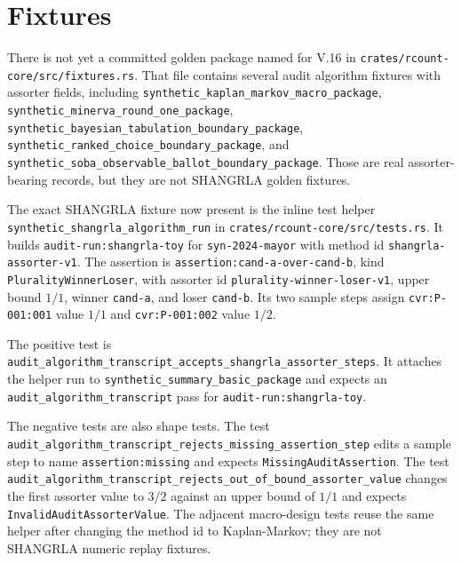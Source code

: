 \section{Fixtures}

There is not yet a committed golden package named for V.16 in
\texttt{crates/rcount-core/src/fixtures.rs}. That file contains several audit
algorithm fixtures with assorter fields, including
\texttt{synthetic\_kaplan\_markov\_macro\_package},
\texttt{synthetic\_minerva\_round\_one\_package},
\texttt{synthetic\_bayesian\_tabulation\_boundary\_package},
\texttt{synthetic\_ranked\_choice\_boundary\_package}, and
\texttt{synthetic\_soba\_observable\_ballot\_boundary\_package}. Those are real
assorter-bearing records, but they are not SHANGRLA golden fixtures.

The exact SHANGRLA fixture now present is the inline test helper
\texttt{synthetic\_shangrla\_algorithm\_run} in
\texttt{crates/rcount-core/src/tests.rs}. It builds
\texttt{audit-run:shangrla-toy} for \texttt{syn-2024-mayor} with method id
\texttt{shangrla-assorter-v1}. The assertion is
\texttt{assertion:cand-a-over-cand-b}, kind \texttt{PluralityWinnerLoser}, with
assorter id \texttt{plurality-winner-loser-v1}, upper bound $1/1$, winner
\texttt{cand-a}, and loser \texttt{cand-b}. Its two sample steps assign
\texttt{cvr:P-001:001} value $1/1$ and \texttt{cvr:P-001:002} value $1/2$.

The positive test is
\texttt{audit\_algorithm\_transcript\_accepts\_shangrla\_assorter\_steps}. It
attaches the helper run to \texttt{synthetic\_summary\_basic\_package} and
expects an \texttt{audit\_algorithm\_transcript} pass for
\texttt{audit-run:shangrla-toy}.

The negative tests are also shape tests. The test
\texttt{audit\_algorithm\_transcript\_rejects\_missing\_assertion\_step} edits a
sample step to name \texttt{assertion:missing} and expects
\texttt{MissingAuditAssertion}. The test
\texttt{audit\_algorithm\_transcript\_rejects\_out\_of\_bound\_assorter\_value}
changes the first assorter value to $3/2$ against an upper bound of $1/1$ and
expects \texttt{InvalidAuditAssorterValue}. The adjacent macro-design tests reuse
the same helper after changing the method id to Kaplan-Markov; they are not
SHANGRLA numeric replay fixtures.
